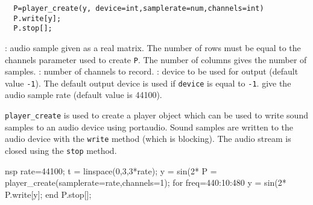
\begin{mandesc}
\end{mandesc}
\begin{calling_sequence}
\begin{verbatim}
  P=player_create(y, device=int,samplerate=num,channels=int)  
  P.write[y];
  P.stop[];
\end{verbatim}
\end{calling_sequence}
\begin{parameters}
  \begin{varlist}
    : audio sample given as a real matrix. The number of 
    rows must be equal to the channels parameter used to create \verb+P+.
    The number of columns gives the number of samples.
   : number of channels to record.
   : device to be used for output (default value \verb+-1+). The default output 
   device is used if \verb+device+ is equal to \verb+-1+.
    give the audio sample rate (default value is 44100).
  \end{varlist}
\end{parameters}

\begin{mandescription}
  \verb+player_create+ is used to create a player object which can be used to 
  write sound samples to an audio device using portaudio. 
  Sound samples are written to the audio device with the \verb+write+ method 
  (which is blocking). The audio stream is closed using the \verb+stop+ method. 
\end{mandescription}
\begin{examples}
  \begin{mintednsp}{nsp}
    rate=44100;
    t = linspace(0,3,3*rate);
    y = sin(2*%
    P = player_create(samplerate=rate,channels=1);
    for freq=440:10:480
      y = sin(2*%
      P.write[y]; 
    end
    P.stop[];
  \end{mintednsp}
\end{examples}
\begin{manseealso}
\end{manseealso}

